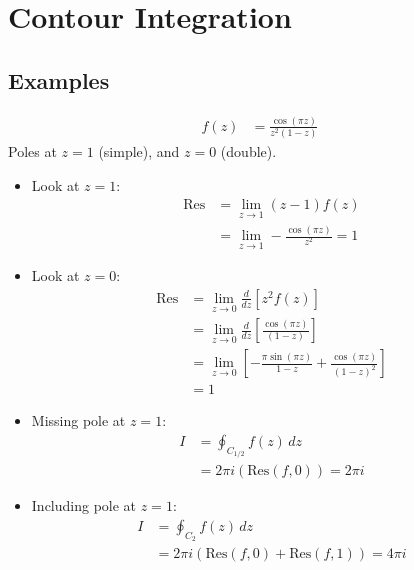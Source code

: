 \documentclass[a4paper, 11pt, normalem]{report}
\begin{document}
\chapter{Contour Integration}

\section{Examples}

\begin{example}[1]
    \begin{align}
        f(z) &= \frac{\cos(\pi z)}{z^2(1-z)}
    \end{align}
    Poles at $z=1$ (simple), and $z=0$ (double).

    \begin{itemize}
        \item Look at $z=1$:
            \begin{align}
                \text{Res} &= \lim_{z\to 1} (z-1)f(z) \\
                           &= \lim_{z\to 1} -\frac{\cos(\pi z)}{z^2} = 1
            \end{align}
        \item Look at $z=0$:
            \begin{align}
                \text{Res} &= \lim_{z\to 0} \frac{d}{dz}[z^2f(z)] \\
                           &= \lim_{z\to 0} \frac{d}{dz} \left[\frac{\cos(\pi z)}{(1-z)}\right] \\
                           &= \lim_{z\to 0} \left[-\frac{\pi\sin(\pi z)}{1-z} + \frac{\cos(\pi z)}{(1-z)^2}\right] \\
                           &= 1
            \end{align}
        \item Missing pole at $z=1$:
            \begin{align}
                I &= \oint_{C_{1/2}} f(z)\,dz \\
                  &= 2\pi i (\text{Res}(f,0)) = 2\pi i
            \end{align}
        \item Including pole at $z=1$:
            \begin{align}
                I &= \oint_{C_2} f(z)\,dz \\
                  &= 2\pi i(\text{Res}(f,0) + \text{Res}(f,1)) = 4\pi i
            \end{align}
    \end{itemize}
\end{example}
\end{document}
